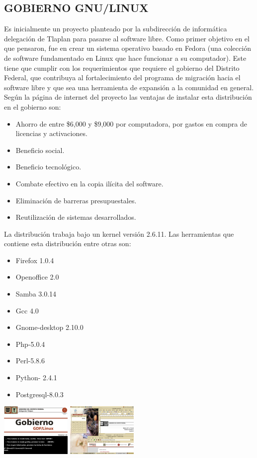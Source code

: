 \subsection*{GOBIERNO GNU/LINUX}
Es inicialmente un proyecto planteado por la subdirección de
informática delegación de Tlaplan para pasarse al software libre.
Como primer objetivo en el que pensaron, fue en crear un 
sistema operativo basado en Fedora (una colección de software
fundamentado en Linux que hace funcionar a su computador).
Este tiene que cumplir con los requerimientos que requiere el
gobierno del Distrito Federal, que contribuya al fortalecimiento
del programa de migración hacia el software libre y que sea una
herramienta de expansión a la comunidad en general.
Según la página de internet del proyecto las ventajas de instalar
esta distribución en el gobierno son:
\begin{itemize}
  \item Ahorro de entre \$6,000 y \$9,000 por computadora, por
	gastos en compra de licencias y activaciones.
  \item Beneficio social.
  \item Beneficio tecnológico.
  \item Combate efectivo en la copia ilícita del software.
  \item Eliminación de barreras presupuestales.
  \item Reutilización de sistemas desarrollados.
\end{itemize}
La distribución trabaja bajo un kernel versión 2.6.11. Las
herramientas que contiene esta distribución entre otras
son:
\begin{itemize}
  \item Firefox 1.0.4
  \item Openoffice 2.0
  \item Samba 3.0.14
  \item Gcc 4.0
  \item Gnome-desktop 2.10.0
  \item Php-5.0.4
  \item Perl-5.8.6
  \item Python- 2.4.1
  \item Postgresql-8.0.3
\end{itemize}
\includegraphics[scale=1]{img/cp06/img0604.png}
\includegraphics[scale=1]{img/cp06/img0605.png}

